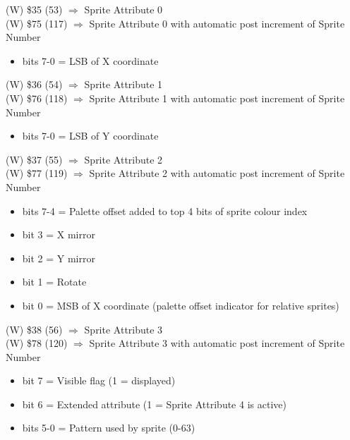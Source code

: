 (W) \$35 (53) $\Rightarrow$ Sprite Attribute 0\\
(W) \$75 (117) $\Rightarrow$ Sprite Attribute 0 with automatic post
increment of Sprite Number
\begin{itemize}
\item[] bits 7-0 = LSB of X coordinate
\end{itemize}

(W) \$36 (54) $\Rightarrow$ Sprite Attribute 1\\
(W) \$76 (118) $\Rightarrow$ Sprite Attribute 1 with automatic post
increment of Sprite Number
\begin{itemize}
\item[] bits 7-0 = LSB of Y coordinate
\end{itemize}

(W) \$37 (55) $\Rightarrow$ Sprite Attribute 2\\
(W) \$77 (119) $\Rightarrow$ Sprite Attribute 2 with automatic post
increment of Sprite Number
\begin{itemize}
\item[] bits 7-4 = Palette offset added to top 4 bits of sprite colour index
\item[] bit 3 = X mirror
\item[] bit 2 = Y mirror
\item[] bit 1 = Rotate
\item[] bit 0 = MSB of X coordinate (palette offset indicator for
  relative sprites)
\end{itemize}

(W) \$38 (56) $\Rightarrow$ Sprite Attribute 3\\
(W) \$78 (120) $\Rightarrow$ Sprite Attribute 3 with automatic post
increment of Sprite Number
\begin{itemize}
\item[] bit 7 = Visible flag (1 = displayed)
\item[] bit 6 = Extended attribute (1 = Sprite Attribute 4 is active)
\item[] bits 5-0 = Pattern used by sprite (0-63)
\end{itemize}

